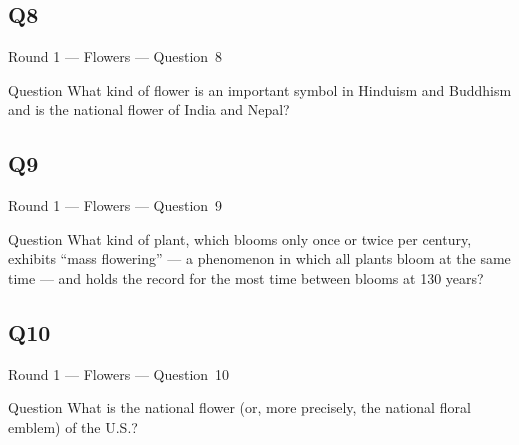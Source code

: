 \documentclass[11pt]{beamer}
\begin{document}
\subsection*{Q8}
\begin{frame}[t]{Round 1 --- Flowers --- \mbox{Question 8}}
\vspace{-0.5em}
\begin{block}{Question}
What kind of flower is an important symbol in Hinduism and Buddhism and is the national flower of India and Nepal?
\end{block}
\end{frame}
\subsection*{Q9}
\begin{frame}[t]{Round 1 --- Flowers --- \mbox{Question 9}}
\vspace{-0.5em}
\begin{block}{Question}
What kind of plant, which blooms only once or twice per century, exhibits ``mass flowering'' --- a phenomenon in which all plants bloom at the same time --- and holds the record for the most time between blooms at 130 years?
\end{block}
\end{frame}
\subsection*{Q10}
\begin{frame}[t]{Round 1 --- Flowers --- \mbox{Question 10}}
\vspace{-0.5em}
\begin{block}{Question}
What is the national flower (or, more precisely, the national floral emblem) of the U.S.?
\end{block}
\end{frame}
\end{document}
